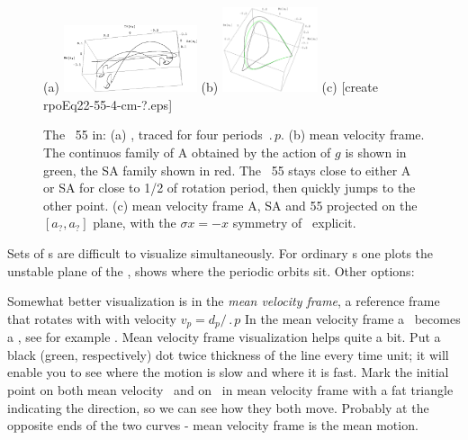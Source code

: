 \begin{figure}[t] \label{f:rpo55}
\begin{center}
(a) \includegraphics[width=0.35\textwidth]{figs/rpo22-55-4-clean.eps}
(b) \includegraphics[width=0.25\textwidth]{figs/rpoEq22-55-4-cm.eps}
(c) [create rpoEq22-55-4-cm-?.eps]
\end{center}
\caption{
 The \rpo\ {\nameit}55 in:
 (a) \Statesp, traced for four periods $\period{p}$.
 (b) mean velocity frame.
        The continuos family of
    {\eqva} A obtained by the action of $g$ is shown in green,
    the SA family shown in red. The \rpo\ {\nameit}55 stays close
    to either A or SA for close to 1/2 of {\eqv} rotation
    period, then quickly jumps to the other {\eqv} point.
 (c) mean velocity frame A, SA and {\nameit}55 projected on the
    $[a_?,a_?]$ plane,
    with the $\sigma x = -x$ symmetry of \KSe\ explicit.
        }
\end{figure}



Sets of \rpo s are difficult to visualize simultaneously.
For ordinary \po s one
plots the unstable plane of the \eqv, shows where the periodic
orbits sit. Other options:

Somewhat better visualization is in the
{\em mean velocity frame}, {\ie}
a reference frame that rotates with with velocity
$v_p=d_p/\period{p}$
In the mean velocity frame a \rpo\ becomes
a \po, see  for example .
Mean velocity frame visualization helps quite a bit.
Put a black (green, respectively) dot
twice thickness of the line every time unit; it will enable you to see
where the motion is slow and where it is fast.
Mark the initial point on both
mean velocity \rpo\ and on \eqv\  in mean velocity
 frame with a fat triangle
indicating the direction, so we can see how they both move. Probably at the
opposite ends of the two curves - mean velocity frame is the mean motion.


